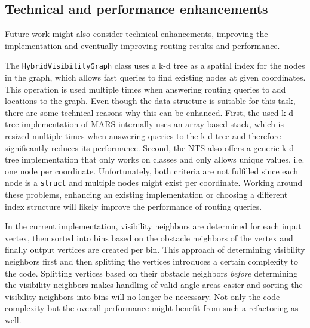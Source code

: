 	\subsection{Technical and performance enhancements}
		
		Future work might also consider technical enhancements, improving the implementation and eventually improving routing results and performance.
	
		The \texttt{HybridVisibilityGraph} class uses a k-d tree as a spatial index for the nodes in the graph, which allows fast queries to find existing nodes at given coordinates.
		This operation is used multiple times when answering routing queries to add locations to the graph.
		Even though the data structure is suitable for this task, there are some technical reasons why this can be enhanced.
		First, the used k-d tree implementation of MARS internally uses an array-based stack, which is resized multiple times when answering queries to the k-d tree and therefore significantly reduces its performance.
		Second, the NTS also offers a generic k-d tree implementation that only works on classes and only allows unique values, i.e. one node per coordinate.
		Unfortunately, both criteria are not fulfilled since each node is a \texttt{struct} and multiple nodes might exist per coordinate.
		Working around these problems, enhancing an existing implementation or choosing a different index structure will likely improve the performance of routing queries.
		
		In the current implementation, visibility neighbors are determined for each input vertex, then sorted into bins based on the obstacle neighbors of the vertex and finally output vertices are created per bin.
		This approach of determining visibility neighbors first and then splitting the vertices introduces a certain complexity to the code.
		Splitting vertices based on their obstacle neighbors \emph{before} determining the visibility neighbors makes handling of valid angle areas easier and sorting the visibility neighbors into bins will no longer be necessary.
		Not only the code complexity but the overall performance might benefit from such a refactoring as well.
		

